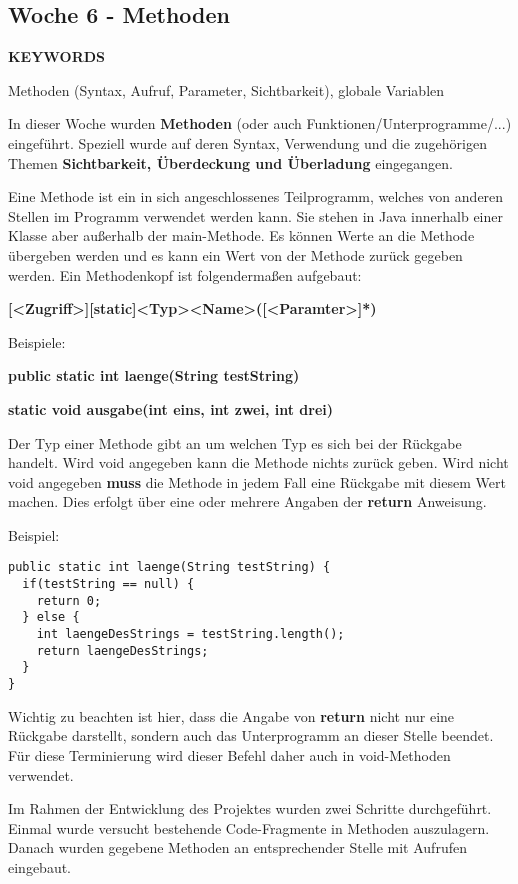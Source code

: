 \subsection{Woche 6 - Methoden}
\label{ch:weeksix}
\line
\begin{center}
	\textbf{KEYWORDS}
	
	Methoden (Syntax, Aufruf, Parameter, Sichtbarkeit), globale Variablen
\end{center}
\line
In dieser Woche wurden \textbf{Methoden} (oder auch Funktionen/Unterprogramme/...) eingeführt. Speziell wurde auf deren Syntax, Verwendung und die zugehörigen Themen \textbf{Sichtbarkeit, Überdeckung und Überladung} eingegangen.

Eine Methode ist ein in sich angeschlossenes Teilprogramm, welches von anderen Stellen im Programm verwendet werden kann. Sie stehen in Java innerhalb einer Klasse aber außerhalb der main-Methode. Es können Werte an die Methode übergeben werden und es kann ein Wert von der Methode zurück gegeben werden. Ein Methodenkopf ist folgendermaßen aufgebaut:

\textbf{[<Zugriff>][static]<Typ><Name>([<Paramter>]*)}

Beispiele:

\textbf{public static int laenge(String testString)}

\textbf{static void ausgabe(int eins, int zwei, int drei)}

Der Typ einer Methode gibt an um welchen Typ es sich bei der Rückgabe handelt. Wird void angegeben kann die Methode nichts zurück geben. Wird nicht void angegeben \textbf{muss} die Methode in jedem Fall eine Rückgabe mit diesem Wert machen. Dies erfolgt über eine oder mehrere Angaben der \textbf{return} Anweisung.

Beispiel:
\begin{verbatim}
public static int laenge(String testString) {
  if(testString == null) {
    return 0;
  } else {
    int laengeDesStrings = testString.length();
    return laengeDesStrings;
  }
}
\end{verbatim}

Wichtig zu beachten ist hier, dass die Angabe von \textbf{return} nicht nur eine Rückgabe darstellt, sondern auch das Unterprogramm an dieser Stelle beendet. Für diese Terminierung wird dieser Befehl daher auch in void-Methoden verwendet.

Im Rahmen der Entwicklung des Projektes wurden zwei Schritte durchgeführt. Einmal wurde versucht bestehende Code-Fragmente in Methoden auszulagern. Danach wurden gegebene Methoden an entsprechender Stelle mit Aufrufen eingebaut.

